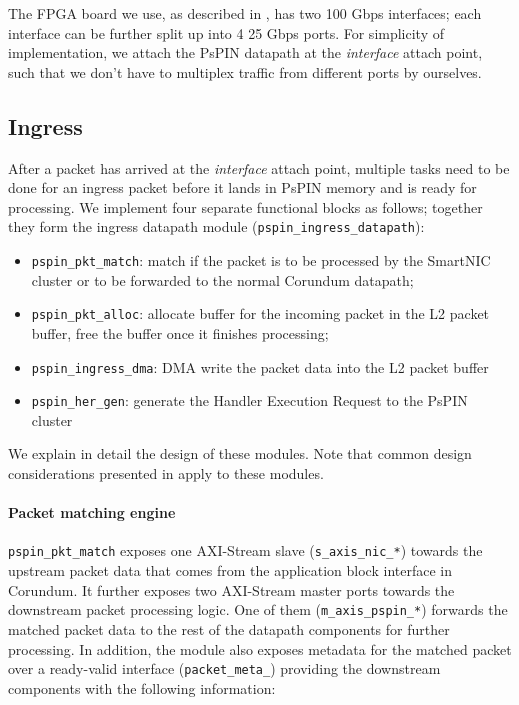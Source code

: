 The FPGA board we use, as described in , has two 100 Gbps interfaces; each interface can be further split up into 4 25 Gbps ports.  For simplicity of implementation, we attach the PsPIN datapath at the \emph{interface} attach point, such that we don't have to multiplex traffic from different ports by ourselves.

\subsection{Ingress}

After a packet has arrived at the \emph{interface} attach point, multiple tasks need to be done for an ingress packet before it lands in PsPIN memory and is ready for processing.  We implement four separate functional blocks as follows; together they form the ingress datapath module (\texttt{pspin\_\-ingress\_\-datapath}):

\begin{itemize}
    \item \texttt{pspin\_\-pkt\_\-match}: match if the packet is to be processed by the SmartNIC cluster or to be forwarded to the normal Corundum datapath;
    \item \texttt{pspin\_\-pkt\_\-alloc}: allocate buffer for the incoming packet in the L2 packet buffer, free the buffer once it finishes processing;
    \item \texttt{pspin\_\-ingress\_\-dma}: DMA write the packet data into the L2 packet buffer
    \item \texttt{pspin\_\-her\_\-gen}: generate the Handler Execution Request to the PsPIN cluster
\end{itemize}

We explain in detail the design of these modules.  Note that common design considerations presented in  apply to these modules.

\paragraph{Packet matching engine} \texttt{pspin\_\-pkt\_\-match} exposes one AXI-Stream slave (\texttt{s\_\-axis\_\-nic\_\-*}) towards the upstream packet data that comes from the application block interface in Corundum.  It further exposes two AXI-Stream master ports towards the downstream packet processing logic.  One of them (\texttt{m\_\-axis\_\-pspin\_\-*}) forwards the matched packet data to the rest of the datapath components for further processing.  In addition, the module also exposes metadata for the matched packet over a ready-valid interface (\texttt{packet\_\-meta\_\-}) providing the downstream components with the following information:

